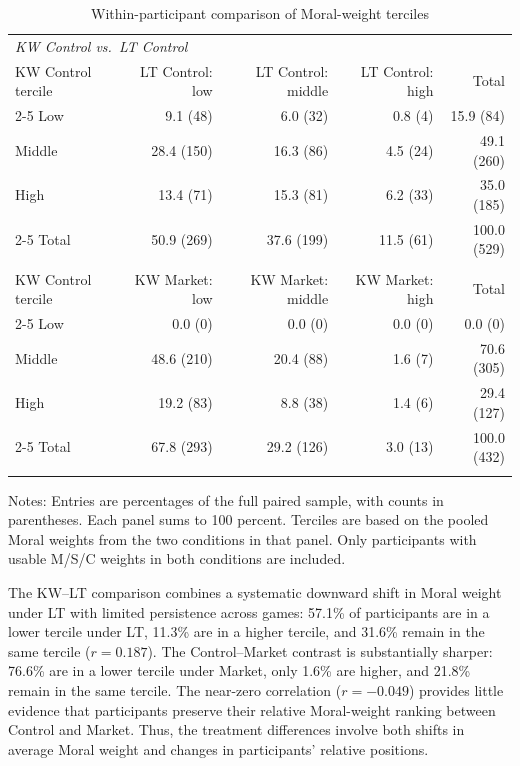 \documentclass{article}
\begin{document}
\begin{table}[H]
\centering
\caption{Within-participant comparison of Moral-weight terciles}
\label{tab:within_moral_transitions}
\begin{tabular}{lrrrr}
\toprule
\multicolumn{5}{l}{\textit{KW Control vs.\ LT Control}} \\
KW Control tercile & LT Control: low & LT Control: middle & LT Control: high & Total \\
\cmidrule(lr){2-5}
Low & 9.1 (48) & 6.0 (32) & 0.8 (4) & 15.9 (84) \\
Middle & 28.4 (150) & 16.3 (86) & 4.5 (24) & 49.1 (260) \\
High & 13.4 (71) & 15.3 (81) & 6.2 (33) & 35.0 (185) \\
\cmidrule(lr){2-5}
Total & 50.9 (269) & 37.6 (199) & 11.5 (61) & 100.0 (529) \\
\addlinespace
\multicolumn{5}{l}{\textit{KW Control vs.\ KW Market}} \\
KW Control tercile & KW Market: low & KW Market: middle & KW Market: high & Total \\
\cmidrule(lr){2-5}
Low & 0.0 (0) & 0.0 (0) & 0.0 (0) & 0.0 (0) \\
Middle & 48.6 (210) & 20.4 (88) & 1.6 (7) & 70.6 (305) \\
High & 19.2 (83) & 8.8 (38) & 1.4 (6) & 29.4 (127) \\
\cmidrule(lr){2-5}
Total & 67.8 (293) & 29.2 (126) & 3.0 (13) & 100.0 (432) \\
\addlinespace
\bottomrule
\end{tabular}
\begin{flushleft}
\footnotesize Notes: Entries are percentages of the full paired sample, with counts in parentheses. Each panel sums to 100 percent. Terciles are based on the pooled Moral weights from the two conditions in that panel. Only participants with usable M/S/C weights in both conditions are included.
\end{flushleft}
\end{table}

The KW--LT comparison combines a systematic downward shift in Moral weight under LT with limited persistence across games: 57.1\% of participants are in a lower tercile under LT, 11.3\% are in a higher tercile, and 31.6\% remain in the same tercile ($r=0.187$). The Control--Market contrast is substantially sharper: 76.6\% are in a lower tercile under Market, only 1.6\% are higher, and 21.8\% remain in the same tercile. The near-zero correlation ($r=-0.049$) provides little evidence that participants preserve their relative Moral-weight ranking between Control and Market. Thus, the treatment differences involve both shifts in average Moral weight and changes in participants' relative positions.
\end{document}
